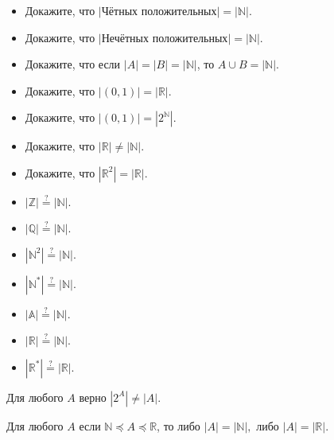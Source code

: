 \documentclass{article}
\newcommand{\N}{\mathbb{N}}
\newcommand{\R}{\mathbb{R}}
\theoremstyle{remark}
\begin{document}
	
\begin{task} 
	
	\begin{minipage}[c]{0.7\textwidth}
		\begin{itemize}
			\item Докажите, что $|$Чётных положительных$| = |\mathbb{N}|.$
			\item Докажите, что $|$Нечётных положительных$| = |\mathbb{N}|.$
			\item Докажите, что если $|A| = |B| = |\mathbb{N}|$, то $A\cup B = |\mathbb{N}|.$
			\item Докажите, что $|(0,1)| = |\mathbb{R}|.$
			\item Докажите, что $|(0,1)| = |2^{\mathbb{N}}|.$
			\item Докажите, что $|\mathbb{R}| \neq |\mathbb{N}|.$
			\item Докажите, что $|\mathbb{R}^2| = |\mathbb{R}|.$
		\end{itemize}
	\end{minipage}
	\begin{minipage}[c]{0.3\textwidth}
		\begin{itemize}
			\item $|\mathbb{Z}| \stackrel{?}{=} |\mathbb{N}|.$
			\item $|\mathbb{Q}| \stackrel{?}{=} |\mathbb{N}|.$
			\item $|\mathbb{N}^2| \stackrel{?}{=} |\mathbb{N}|.$
			\item $|\mathbb{N}^*| \stackrel{?}{=} |\mathbb{N}|.$
			\item $|\mathbb{A}| \stackrel{?}{=} |\mathbb{N}|.$
			\item $|\mathbb{R}| \stackrel{?}{=} |\mathbb{N}|.$
			\item $|\mathbb{R}^*| \stackrel{?}{=} |\mathbb{R}|.$
		\end{itemize}
	\end{minipage}
\end{task}

\begin{theorem}[ (Кантора)]
	Для любого $A$ верно $|2^A| \neq |A|.$
\end{theorem}

\begin{theorem}
Для любого $A$ если $\N \preccurlyeq A \preccurlyeq \R$, то либо $|A| = |\N|,$ либо $|A| = |\R|.$ 
\end{theorem}
\end{document}
